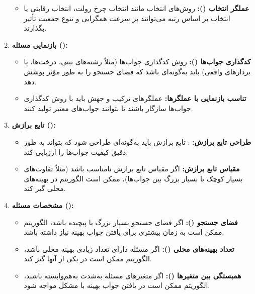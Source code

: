 \documentclass[12pt]{exam}
\begin{document}
\begin{questions}
\begin{parts}
\begin{enumerate}
\begin{itemize}
	 		 \item \textbf{عملگر انتخاب (): }
	 		 روش‌های انتخاب مانند انتخاب چرخ رولت، انتخاب رقابتی یا انتخاب بر اساس رتبه می‌توانند بر سرعت همگرایی و تنوع جمعیت تأثیر بگذارند.
	 	\end{itemize}
	 	
	 	\item \textbf{بازنمایی مسئله ():}
	 	
	 		\begin{itemize}
	 		\item \textbf{کدگذاری جواب‌ها ():}
	 		روش کدگذاری جواب‌ها (مثلاً رشته‌های بیتی، درخت‌ها، یا بردارهای واقعی) باید به‌گونه‌ای باشد که فضای جستجو را به طور مؤثر پوشش دهد.
	 		\item \textbf{تناسب بازنمایی با عملگرها:}
	 		عملگرهای ترکیب و جهش باید با روش کدگذاری جواب‌ها سازگار باشند تا بتوانند جواب‌های معتبر تولید کنند.
	 	\end{itemize}
	 \item \textbf{تابع برازش ():}
	 
	 \begin{itemize}
	 	\item \textbf{طراحی تابع برازش:}
	 	: تابع برازش باید به‌گونه‌ای طراحی شود که بتواند به طور دقیق کیفیت جواب‌ها را ارزیابی کند.
	 	\item \textbf{مقیاس تابع برازش:}
	 	اگر مقیاس تابع برازش نامناسب باشد (مثلاً تفاوت‌های بسیار کوچک یا بسیار بزرگ بین جواب‌ها)، ممکن است الگوریتم در بهینه‌های محلی گیر کند.
	 	
	 \end{itemize}
	 
	 \item \textbf{مشخصات مسئله ():}
	 
	 \begin{itemize}
	 	\item \textbf{فضای جستجو (): }
	 	اگر فضای جستجو بسیار بزرگ یا پیچیده باشد، الگوریتم ممکن است به زمان بیشتری برای یافتن جواب بهینه نیاز داشته باشد.
	 	\item \textbf{تعداد بهینه‌های محلی (): }
	 	اگر مسئله دارای تعداد زیادی بهینه محلی باشد، الگوریتم ممکن است در یکی از آنها گیر کند.
	 	
	 	\item \textbf{همبستگی بین متغیرها (): }
	 	اگر متغیرهای مسئله به‌شدت به‌هم‌وابسته باشند، الگوریتم ممکن است در یافتن جواب بهینه با مشکل مواجه شود.
	 	

\end{itemize}
\end{enumerate}
\end{parts}
\end{questions}
\end{document}
